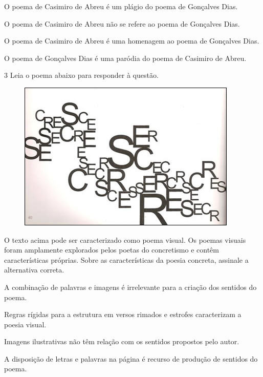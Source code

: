 \begin{escolha}

  \item O poema de Casimiro de Abreu é um plágio do poema de Gonçalves Dias.

  \item O poema de Casimiro de Abreu não se refere ao poema de Gonçalves Dias.

  \item O poema de Casimiro de Abreu é uma homenagem ao poema de Gonçalves Dias.

  \item O poema de Gonçalves Dias é uma paródia do poema de Casimiro de Abreu.

\end{escolha}

\num{3} Leia o poema abaixo para responder à questão.

\begin{figure}
\centering
\includegraphics[width=4.11458in,height=2.80208in]{./imgSAEB_7_POR/media/image3.png}
\end{figure}


O texto acima pode ser caracterizado como poema visual. Os poemas visuais
foram amplamente explorados pelos poetas do concretismo e contêm
características próprias. Sobre as características da poesia concreta,
assinale a alternativa correta.

\begin{escolha}

  \item A combinação de palavras e imagens é irrelevante para a criação dos sentidos do poema. 

  \item Regras rígidas para a estrutura em versos rimados e estrofes caracterizam a poesia visual.

  \item Imagens ilustrativas não têm relação com os sentidos propostos pelo autor.

  \item A disposição de letras e palavras na página é recurso de produção de sentidos do poema.

\end{escolha}

